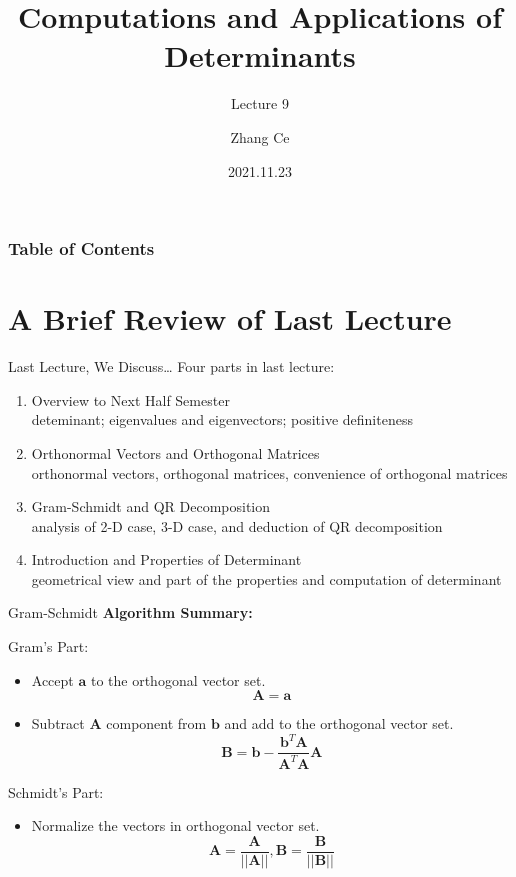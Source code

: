 \documentclass{beamer}
\title[Linear Algebra] %
{Computations and Applications of Determinants}
\subtitle{Lecture 9}
\author[11910803@mail.sustech.edu.cn] %
{
    Zhang Ce
}
\institute[] %
{
    Department of Electrical and Electronic Engineering\\
    Southern University of Science and Technology
}
\date[2021.11.23] %
{2021.11.23}
\begin{document}
\frame{\titlepage}


\begin{frame}
\frametitle{Table of Contents}
\tableofcontents
\end{frame}
\section{A Brief Review of Last Lecture}
\begin{frame}{Last Lecture, We Discuss\dots}
Four parts in last lecture:
    \begin{enumerate}
        \item Overview to Next Half Semester\\
        deteminant; eigenvalues and eigenvectors; positive definiteness
        \item Orthonormal Vectors and Orthogonal Matrices\\
        orthonormal vectors, orthogonal matrices, convenience of orthogonal matrices
        \item Gram-Schmidt and QR Decomposition\\
        analysis of 2-D case, 3-D case, and deduction of QR decomposition
        \item Introduction and Properties of Determinant\\
        geometrical view and part of the properties and computation of determinant
    \end{enumerate}

\end{frame}

\begin{frame}{Gram-Schmidt}
\textbf{Algorithm Summary:}

\vspace{3pt}
Gram's Part:
\begin{itemize}
    \item Accept $\mathbf{a}$ to the orthogonal vector set.
    \begin{equation*}
        \mathbf{A}=\mathbf{a}
    \end{equation*}
    \item Subtract $\mathbf{A}$ component from $\mathbf{b}$ and add to the orthogonal vector set.
    \begin{equation*}
        \mathbf{B}=\mathbf{b}-\frac{\mathbf{b}^T\mathbf{A}}{\mathbf{A}^T\mathbf{A}}\mathbf{A}
    \end{equation*}
\end{itemize}

Schmidt's Part:
\begin{itemize}
    \item Normalize the vectors in orthogonal vector set.
    \begin{equation*}
        \mathbf{A}=\frac{\mathbf{A}}{||\mathbf{A}||}, \mathbf{B}=\frac{\mathbf{B}}{||\mathbf{B}||}
    \end{equation*}
\end{itemize}
\end{frame}
\end{document}
